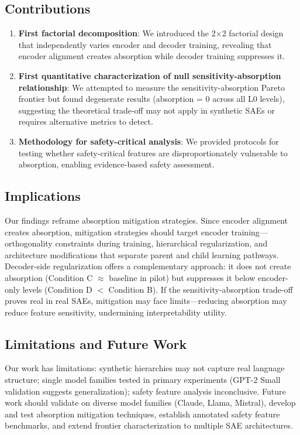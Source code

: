 \documentclass{article}
\begin{document}
\subsection{Contributions}

\begin{enumerate}
\item \textbf{First factorial decomposition}: We introduced the 2$\times$2 factorial design that independently varies encoder and decoder training, revealing that encoder alignment creates absorption while decoder training suppresses it.

\item \textbf{First quantitative characterization of null sensitivity-absorption relationship}: We attempted to measure the sensitivity-absorption Pareto frontier but found degenerate results (absorption = 0 across all L0 levels), suggesting the theoretical trade-off may not apply in synthetic SAEs or requires alternative metrics to detect.

\item \textbf{Methodology for safety-critical analysis}: We provided protocols for testing whether safety-critical features are disproportionately vulnerable to absorption, enabling evidence-based safety assessment.
\end{enumerate}

\subsection{Implications}

Our findings reframe absorption mitigation strategies. Since encoder alignment creates absorption, mitigation strategies should target encoder training---orthogonality constraints during training, hierarchical regularization, and architecture modifications that separate parent and child learning pathways. Decoder-side regularization offers a complementary approach: it does not create absorption (Condition C $\approx$ baseline in pilot) but suppresses it below encoder-only levels (Condition D $<$ Condition B). If the sensitivity-absorption trade-off proves real in real SAEs, mitigation may face limits---reducing absorption may reduce feature sensitivity, undermining interpretability utility.

\subsection{Limitations and Future Work}

Our work has limitations: synthetic hierarchies may not capture real language structure; single model families tested in primary experiments (GPT-2 Small validation suggests generalization); safety feature analysis inconclusive. Future work should validate on diverse model families (Claude, Llama, Mistral), develop and test absorption mitigation techniques, establish annotated safety feature benchmarks, and extend frontier characterization to multiple SAE architectures.
\end{document}
